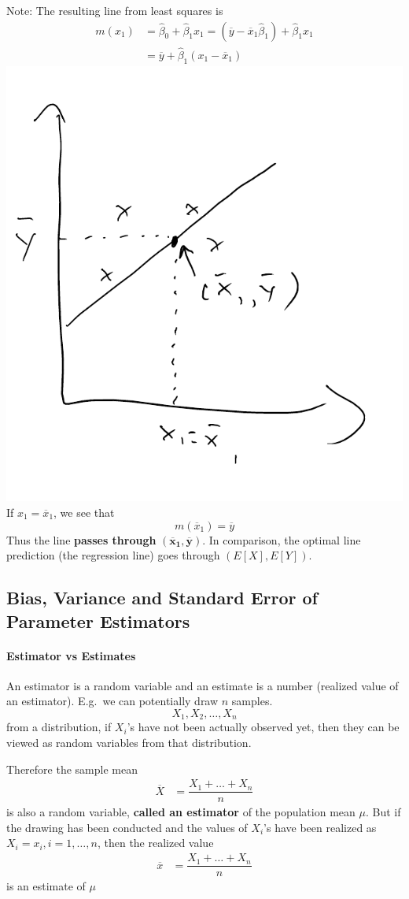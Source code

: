 \documentclass[12 pt]{article}
\begin{document}
Note: The resulting line from least squares is
\begin{align*}
  m(x_1) & = \hat{\beta}_0 + \hat{\beta}_1 x_1 = (\overline{y} - \overline{x}_1 \hat{\beta}_1) + \hat{\beta}_1 x_1
  \\ & = \overline{y} + \hat{\beta}_1 (x_1 - \overline{x}_1)
\end{align*}
\includegraphics[width=.5\textwidth]{11.pdf}
\\ If $x_1 = \overline{x}_1$, we see that
$$m(\overline{x}_1) = \overline{y}$$
Thus the line \textbf{passes through} $\mathbf{(\overline{x}_1, \overline{y})}$. In comparison, the optimal line prediction (the
regression line) goes through $(E[X], E[Y])$.
\subsection{Bias, Variance and Standard Error of Parameter Estimators}
\paragraph{Estimator vs Estimates} An estimator is a random variable
and an estimate is a number (realized value of an estimator). E.g.\ we
can potentially draw $n$ samples.
$$X_1, X_2, \ldots, X_n$$
from a distribution, if $X_i$'s have not been actually observed yet,
then they can be viewed as random variables from that distribution.

Therefore the sample mean
\begin{align*}
  \overline{X} & = \dfrac{X_1 + \ldots + X_n}{n}
\end{align*}
is also a random variable, \textbf{called an estimator} of the
population mean $\mu$. But if the drawing has been conducted and the
values of $X_i$'s have been realized as $X_i = x_i, i = 1, \ldots, n$,
then the realized value
\begin{align*}
  \overline{x} & = \dfrac{X_1 + \ldots + X_n}{n}
\end{align*}
is an estimate of $\mu$
\end{document}
